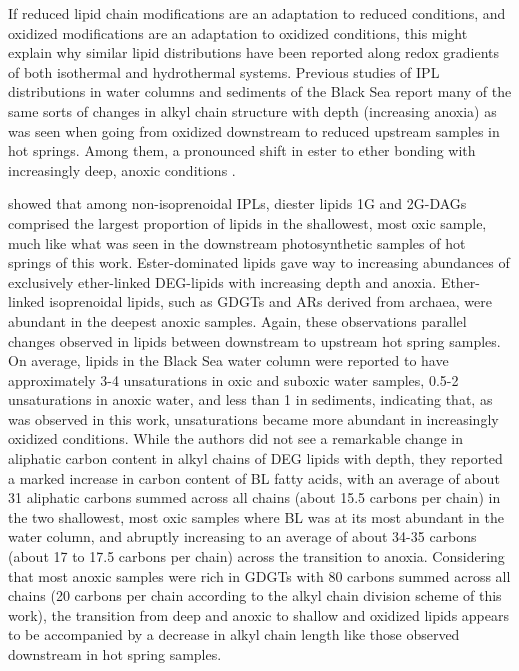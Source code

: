 If reduced lipid chain modifications are an adaptation to reduced conditions, and oxidized modifications are an adaptation to oxidized conditions, this might explain why similar lipid distributions have been reported along redox gradients of both isothermal and hydrothermal systems. Previous studies of IPL distributions in water columns and sediments of the Black Sea report many of the same sorts of changes in alkyl chain structure with depth (increasing anoxia) as was seen when going from oxidized downstream to reduced upstream samples in hot springs. Among them, a pronounced shift in ester to ether bonding with increasingly deep, anoxic conditions \citep{schroder2015intact, schubotz2009detection}.

\cite{schroder2015intact} showed that among non-isoprenoidal IPLs, diester lipids 1G and 2G-DAGs comprised the largest proportion of lipids in the shallowest, most oxic sample, much like what was seen in the downstream photosynthetic samples of hot springs of this work. Ester-dominated lipids gave way to increasing abundances of exclusively ether-linked DEG-lipids with increasing depth and anoxia. Ether-linked isoprenoidal lipids, such as GDGTs and ARs derived from archaea, were abundant in the deepest anoxic samples. Again, these observations parallel changes observed in lipids between downstream to upstream hot spring samples. On average, lipids in the Black Sea water column were reported to have approximately 3-4 unsaturations in oxic and suboxic water samples, 0.5-2 unsaturations in anoxic water, and less than 1 in sediments, indicating that, as was observed in this work, unsaturations became more abundant in increasingly oxidized conditions. While the authors did not see a remarkable change in aliphatic carbon content in alkyl chains of DEG lipids with depth, they reported a marked increase in carbon content of BL fatty acids, with an average of about 31 aliphatic carbons summed across all chains (about 15.5 carbons per chain) in the two shallowest, most oxic samples where BL was at its most abundant in the water column, and abruptly increasing to an average of about 34-35 carbons (about 17 to 17.5 carbons per chain) across the transition to anoxia. Considering that most anoxic samples were rich in GDGTs with 80 carbons summed across all chains (20 carbons per chain according to the alkyl chain division scheme of this work), the transition from deep and anoxic to shallow and oxidized lipids appears to be accompanied by a decrease in alkyl chain length like those observed downstream in hot spring samples.


